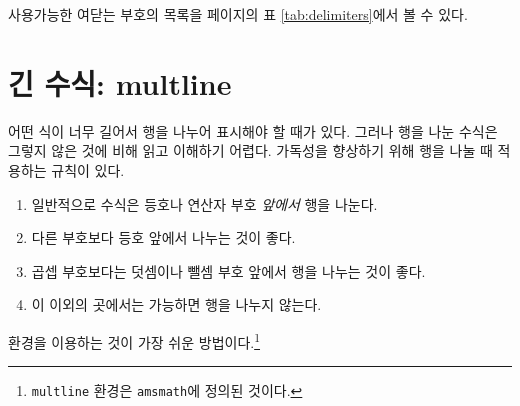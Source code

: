 사용가능한 여닫는 부호의 목록을 \pageref{tab:delimiters}페이지의 표 \ref{tab:delimiters}에서 볼 수 있다.

\section{긴 수식: multline}
\label{sec:multline}

어떤 식이 너무 길어서 행을 나누어
표시해야 할 때가 있다. 그러나 행을 나눈 수식은 그렇지 않은 것에 비해 
읽고 이해하기 어렵다. 가독성을 향상하기 위해 행을 나눌 때 적용하는 규칙이 있다.
\begin{enumerate}
\item 일반적으로 수식은 등호나 연산자 부호 \emph{앞에서} 행을 나눈다.
\item 다른 부호보다 등호 앞에서 나누는 것이 좋다.
\item 곱셉 부호보다는 덧셈이나 뺄셈 부호 앞에서 행을 나누는 것이 좋다.
\item 이 이외의 곳에서는 가능하면 행을 나누지 않는다.
\end{enumerate}
 환경을 이용하는 것이 가장 쉬운 방법이다.\footnote{%
  \texttt{multline} 환경은 \texttt{amsmath}에 정의된 것이다.
}
